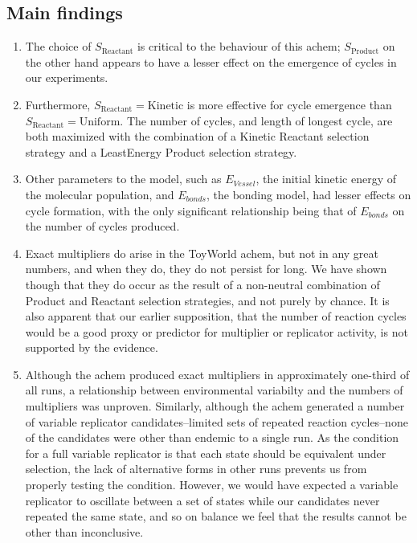 \subsection{Main findings}

\begin{enumerate}
	
\item The choice of $S_\mathrm{Reactant}$ is critical to the behaviour of this \gls{achem}; $S_\mathrm{Product}$ on the other hand appears to have a lesser effect on the emergence of cycles in our experiments.

\item Furthermore, $S_\mathrm{Reactant} = \mathrm{Kinetic}$ is more effective for cycle emergence than $S_\mathrm{Reactant} = \mathrm{Uniform}$. The number of cycles, and length of longest cycle, are both maximized with the combination of a Kinetic Reactant selection strategy and a LeastEnergy Product selection strategy.

\item Other parameters to the model, such as $E_{Vessel}$, the initial kinetic energy of the molecular population, and $E_{bonds}$, the bonding model, had lesser effects on cycle formation, with the only significant relationship being that of $E_{bonds}$ on the number of cycles produced.

\item Exact multipliers do arise in the ToyWorld \gls{achem}, but not in any great numbers, and when they do, they do not persist for long. We have shown though that they do occur as the result of a non-neutral combination of Product and Reactant selection strategies, and not purely by chance. It is also apparent that our earlier supposition, that the number of reaction cycles would be a good proxy or predictor for multiplier or replicator activity, is not supported by the evidence.

\item Although the \gls{achem} produced exact multipliers in approximately one-third of all runs, a relationship between environmental variabilty and the numbers of multipliers was unproven. Similarly, although the \gls{achem} generated a number of variable replicator candidates--limited sets of repeated reaction cycles--none of the candidates were other than endemic to a single run. As the condition for a full variable replicator is that each state should be equivalent under selection, the lack of alternative forms in other runs prevents us from properly testing the condition. However, we would have expected a variable replicator to oscillate between a set of states while our candidates never repeated the same state, and so on balance we feel that the results cannot be other than inconclusive.

\end{enumerate}

